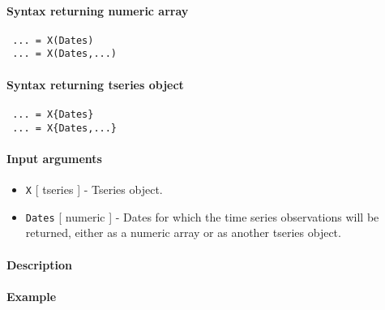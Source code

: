 


	\paragraph{Syntax returning numeric array}
 
 \begin{verbatim}
 ... = X(Dates)
 ... = X(Dates,...)
 \end{verbatim}
 
 \paragraph{Syntax returning tseries object}
 
 \begin{verbatim}
 ... = X{Dates}
 ... = X{Dates,...}
 \end{verbatim}
 
 \paragraph{Input arguments}
 
 \begin{itemize}
 \item
   \texttt{X} {[} tseries {]} - Tseries object.
 \item
   \texttt{Dates} {[} numeric {]} - Dates for which the time series
   observations will be returned, either as a numeric array or as another
   tseries object.
 \end{itemize}
 
 \paragraph{Description}
 
 \paragraph{Example}


